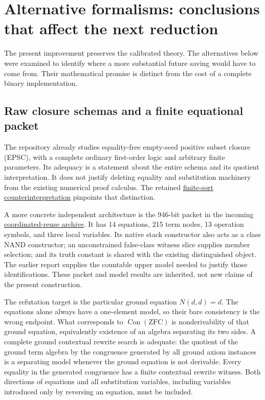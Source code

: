 \section{Alternative formalisms: conclusions that affect the next reduction}
\label{sec:logic-review-alternatives}

The present improvement preserves the calibrated theory.  The alternatives
below were examined to identify where a more substantial future saving
would have to come from.  Their mathematical promise is distinct from
the cost of a complete binary implementation.

\subsection{Raw closure schemas and a finite equational packet}

The repository already studies equality-free empty-seed positive subset
closure (EPSC), with a complete ordinary first-order logic and arbitrary
finite parameters.  Its adequacy is a statement about the entire schema
and its quotient interpretation.  It does not justify deleting equality
and substitution machinery from the existing numerical proof calculus.
The retained
\href{https://github.com/VladimirReshetnikov/ProveIt/blob/ce192939372ac7944fe2a0208c68a96d49fb5e3b/Computability/BusyBeaver/Research/ZFC/typed_countermodel.md}
{finite-sort counterinterpretation} pinpoints that distinction.

A more concrete independent architecture is the 946-bit packet in the
incoming
\href{https://github.com/VladimirReshetnikov/ProveIt/blob/ce192939372ac7944fe2a0208c68a96d49fb5e3b/docs/incoming/BusyBeaver239_Research_2026-10-19.zip}
{coordinated-reuse archive}.  It has 14 equations, 215 term nodes,
13 operation symbols, and three local variables.  Its native stack
constructor also acts as a class NAND constructor; an unconstrained
false-class witness slice supplies member selection; and its truth
constant is shared with the existing distinguished object.  The earlier
report supplies the countable upper model needed to justify those
identifications.  These packet and model results are inherited, not new
claims of the present construction.

The refutation target is the particular ground equation $N(d,d)=d$.
The equations alone always have a one-element model, so their bare
consistency is the wrong endpoint.  What corresponds to
$\operatorname{Con}(\mathrm{ZFC})$ is nonderivability of that ground
equation, equivalently existence of an algebra separating its two sides.
A complete ground contextual rewrite search is adequate: the quotient of
the ground term algebra by the congruence generated by all ground axiom
instances is a separating model whenever the ground equation is not
derivable.  Every equality in the generated congruence has a finite
contextual rewrite witness.  Both directions of equations and all
substitution variables, including variables introduced only by reversing
an equation, must be included.

